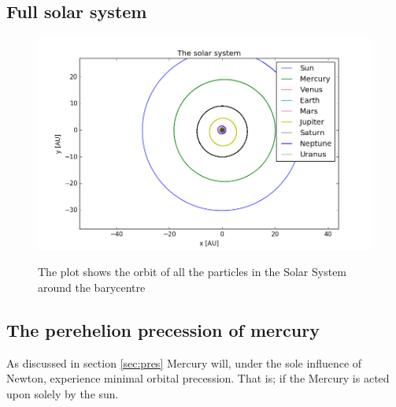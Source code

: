 \subsection{Full solar system}
\begin{figure}[H]
\includegraphics[width=\textwidth]{figures/solarsystem}\label{fig:all}
\caption{The plot shows the orbit of all the particles in the Solar System around the barycentre}
\end{figure}

\subsection{The perehelion precession of mercury}
As discussed in section \ref{sec:pres} Mercury will, under the sole influence of Newton, experience minimal orbital precession. That is; if the Mercury is acted upon solely by the sun.  

